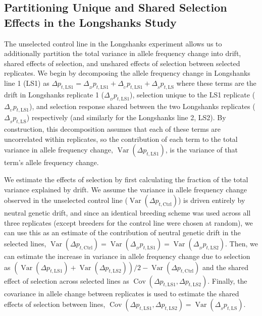 \documentclass[9pt,twocolumn,twoside]{pnas-new}
\DeclareMathOperator{\var}{Var}
\DeclareMathOperator{\cov}{Cov}
\begin{document}
{\subsection*{Partitioning Unique and Shared Selection Effects in the Longshanks Study}
\label{sec:mm-partition}

The unselected control line in the Longshanks experiment allows us to
additionally partition the total variance in allele frequency change into
drift, shared effects of selection, and unshared effects of selection between
selected replicates. We begin by decomposing the allele frequency change in
Longshanks line 1 (LS1) as $\Delta p_{t,\mathrm{LS1}} = \Delta_{_{D}}
p_{t,\mathrm{LS1}} + \Delta_{_{U}} p_{t,\mathrm{LS1}} + \Delta_{_S}
p_{t,\mathrm{LS}}$ where these terms are the drift in Longshanks replicate 1
($\Delta_{_D} p_{t,\mathrm{LS1}}$), selection unique to the LS1 replicate
($\Delta_{_U} p_{t,\mathrm{LS1}}$), and selection response shared between the
two Longshanks replicates ($\Delta_{_S} p_{t,\mathrm{LS}}$) respectively (and
similarly for the Longshanks line 2, LS2). By construction, this decomposition
assumes that each of these terms are uncorrelated within replicates, so the
contribution of each term to the total variance in allele frequency change,
$\var(\Delta p_{t,\mathrm{LS1}})$, is the variance of that term's allele
frequency change. 

We estimate the effects of selection by first calculating the fraction of the
total variance explained by drift. We assume the variance in allele frequency
change observed in the unselected control line ($\var(\Delta
p_{t,\mathrm{Ctrl}})$) is driven entirely by neutral genetic drift, and since
an identical breeding scheme was used across all three replicates (except
breeders for the control line were chosen at random), we can use this as an
estimate of the contribution of neutral genetic drift in the selected lines,
$\var(\Delta p_{t,\mathrm{Ctrl}}) = \var(\Delta_{_{D}} p_{t,\mathrm{LS1}}) =
\var(\Delta_{_{D}} p_{t,\mathrm{LS2}})$. Then, we can estimate the increase in
variance in allele frequency change due to selection as $(\var(\Delta
p_{t,\mathrm{LS1}}) + \var(\Delta p_{t,\mathrm{LS2}}))/2 - \var(\Delta
p_{t,\mathrm{Ctrl}})$ and the shared effect of selection across selected lines
as $\cov(\Delta p_{t,\mathrm{LS1}}, \Delta p_{t,\mathrm{LS2}})$. Finally, the
covariance in allele change between replicates is used to estimate the shared
effects of selection between lines, $\cov(\Delta p_{t,\mathrm{LS1}}, \Delta
p_{t,\mathrm{LS2}}) = \var(\Delta_{_S} p_{t,\mathrm{LS}})$.

}
\end{document}

